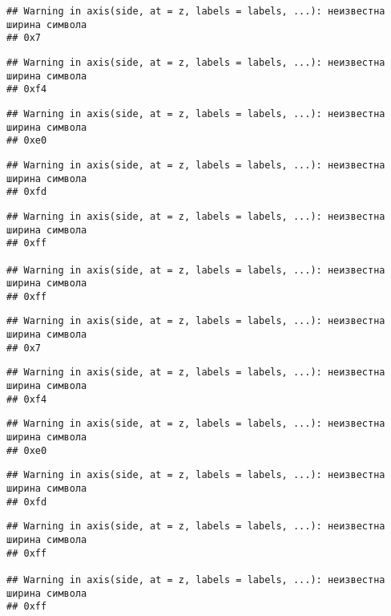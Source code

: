 \documentclass[
]{article}
\begin{document}
\begin{verbatim}
## Warning in axis(side, at = z, labels = labels, ...): неизвестна ширина символа
## 0x7
\end{verbatim}

\begin{verbatim}
## Warning in axis(side, at = z, labels = labels, ...): неизвестна ширина символа
## 0xf4
\end{verbatim}

\begin{verbatim}
## Warning in axis(side, at = z, labels = labels, ...): неизвестна ширина символа
## 0xe0
\end{verbatim}

\begin{verbatim}
## Warning in axis(side, at = z, labels = labels, ...): неизвестна ширина символа
## 0xfd
\end{verbatim}

\begin{verbatim}
## Warning in axis(side, at = z, labels = labels, ...): неизвестна ширина символа
## 0xff

## Warning in axis(side, at = z, labels = labels, ...): неизвестна ширина символа
## 0xff
\end{verbatim}

\begin{verbatim}
## Warning in axis(side, at = z, labels = labels, ...): неизвестна ширина символа
## 0x7
\end{verbatim}

\begin{verbatim}
## Warning in axis(side, at = z, labels = labels, ...): неизвестна ширина символа
## 0xf4
\end{verbatim}

\begin{verbatim}
## Warning in axis(side, at = z, labels = labels, ...): неизвестна ширина символа
## 0xe0
\end{verbatim}

\begin{verbatim}
## Warning in axis(side, at = z, labels = labels, ...): неизвестна ширина символа
## 0xfd
\end{verbatim}

\begin{verbatim}
## Warning in axis(side, at = z, labels = labels, ...): неизвестна ширина символа
## 0xff

## Warning in axis(side, at = z, labels = labels, ...): неизвестна ширина символа
## 0xff
\end{verbatim}
\end{document}
